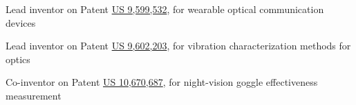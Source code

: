\item Lead inventor on Patent \href{https://patents.google.com/patent/US9599532}{US 9,599,532}, for wearable optical communication devices
\item Lead inventor on Patent \href{https://patents.google.com/patent/US9602203B2/en}{US 9,602,203}, for vibration characterization methods for optics
\item Co-inventor on Patent \href{https://uspto.report/patent/grant/10,670,687}{US 10,670,687}, for night-vision goggle effectiveness measurement